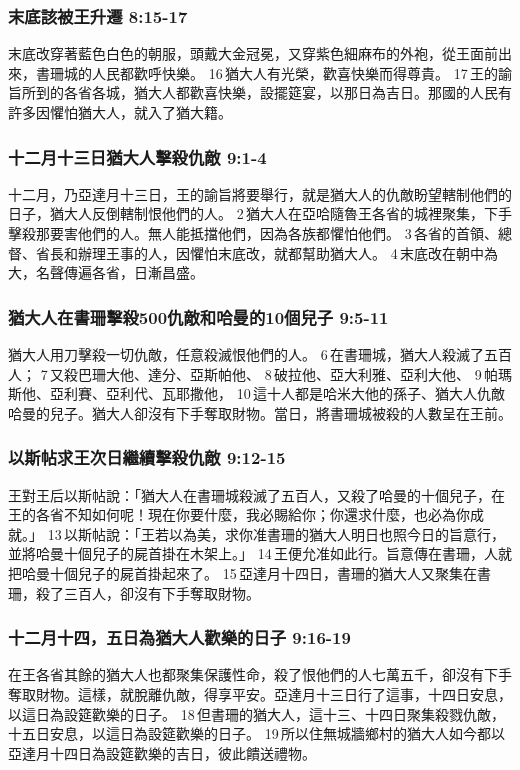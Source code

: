 \subsubsection{末底該被王升遷 8:15-17}
末底改穿著藍色白色的朝服，頭戴大金冠冕，又穿紫色細麻布的外袍，從王面前出來，書珊城的人民都歡呼快樂。 16 猶大人有光榮，歡喜快樂而得尊貴。 17 王的諭旨所到的各省各城，猶大人都歡喜快樂，設擺筵宴，以那日為吉日。那國的人民有許多因懼怕猶大人，就入了猶大籍。

\subsubsection{十二月十三日猶大人擊殺仇敵 9:1-4}
十二月，乃亞達月十三日，王的諭旨將要舉行，就是猶大人的仇敵盼望轄制他們的日子，猶大人反倒轄制恨他們的人。 2 猶大人在亞哈隨魯王各省的城裡聚集，下手擊殺那要害他們的人。無人能抵擋他們，因為各族都懼怕他們。 3 各省的首領、總督、省長和辦理王事的人，因懼怕末底改，就都幫助猶大人。 4 末底改在朝中為大，名聲傳遍各省，日漸昌盛。

\subsubsection{猶大人在書珊擊殺500仇敵和哈曼的10個兒子 9:5-11}
猶大人用刀擊殺一切仇敵，任意殺滅恨他們的人。 6 在書珊城，猶大人殺滅了五百人； 7 又殺巴珊大他、達分、亞斯帕他、 8 破拉他、亞大利雅、亞利大他、 9 帕瑪斯他、亞利賽、亞利代、瓦耶撒他， 10 這十人都是哈米大他的孫子、猶大人仇敵哈曼的兒子。猶大人卻沒有下手奪取財物。當日，將書珊城被殺的人數呈在王前。

\subsubsection{以斯帖求王次日繼續擊殺仇敵 9:12-15}
王對王后以斯帖說：「猶大人在書珊城殺滅了五百人，又殺了哈曼的十個兒子，在王的各省不知如何呢！現在你要什麼，我必賜給你；你還求什麼，也必為你成就。」 13 以斯帖說：「王若以為美，求你准書珊的猶大人明日也照今日的旨意行，並將哈曼十個兒子的屍首掛在木架上。」 14 王便允准如此行。旨意傳在書珊，人就把哈曼十個兒子的屍首掛起來了。 15 亞達月十四日，書珊的猶大人又聚集在書珊，殺了三百人，卻沒有下手奪取財物。

\subsubsection{十二月十四，五日為猶大人歡樂的日子 9:16-19}
在王各省其餘的猶大人也都聚集保護性命，殺了恨他們的人七萬五千，卻沒有下手奪取財物。這樣，就脫離仇敵，得享平安。亞達月十三日行了這事，十四日安息，以這日為設筵歡樂的日子。 18 但書珊的猶大人，這十三、十四日聚集殺戮仇敵，十五日安息，以這日為設筵歡樂的日子。 19 所以住無城牆鄉村的猶大人如今都以亞達月十四日為設筵歡樂的吉日，彼此饋送禮物。

